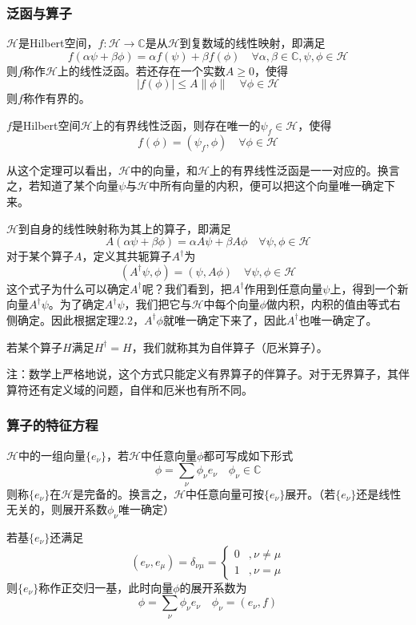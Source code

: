 \subsubsection{泛函与算子}
$\mathcal{H}$是Hilbert空间，$f:\mathcal{H}\to \mathbb{C}$是从$\mathcal{H}$到复数域的线性映射，即满足
$$f(\alpha\psi+\beta\phi)=\alpha f(\psi)+\beta f(\phi)\quad\forall\alpha,\beta\in\mathbb{C},\psi,\phi\in\mathcal{H}$$
则$f$称作$\mathcal{H}$上的线性泛函。若还存在一个实数$A\geq 0$，使得
$$|f(\phi)|\leq A\|\phi\|\quad\forall\phi\in\mathcal{H}$$
则$f$称作有界的。

\begin{theorem}
    $f$是Hilbert空间$\mathcal{H}$上的有界线性泛函，则存在唯一的$\psi_f\in\mathcal{H}$，使得
    $$f(\phi)=(\psi_f,\phi)\quad\forall \phi\in\mathcal{H}$$
\end{theorem}
从这个定理可以看出，$\mathcal{H}$中的向量，和$\mathcal{H}$上的有界线性泛函是一一对应的。换言之，若知道了某个向量$\psi$与$\mathcal{H}$中所有向量的内积，便可以把这个向量唯一确定下来。

$\mathcal{H}$到自身的线性映射称为其上的算子，即满足
$$A(\alpha\psi+\beta\phi)=\alpha A\psi+\beta A\phi\quad \forall\psi,\phi\in \mathcal{H}$$
对于某个算子$A$，定义其共轭算子$A^\dagger$为
$$(A^\dagger\psi,\phi)=(\psi,A\phi)\quad \forall\psi,\phi\in\mathcal{H}$$
这个式子为什么可以确定$A^\dagger$呢？我们看到，把$A^\dagger$作用到任意向量$\psi$上，得到一个新向量$A^\dagger\psi$。为了确定$A^\dagger\psi$，我们把它与$\mathcal{H}$中每个向量$\phi$做内积，内积的值由等式右侧确定。因此根据定理2.2，$A^\dagger\phi$就唯一确定下来了，因此$A^\dagger$也唯一确定了。

若某个算子$H$满足$H^\dagger=H$，我们就称其为自伴算子（厄米算子）。

注：数学上严格地说，这个方式只能定义有界算子的伴算子。对于无界算子，其伴算符还有定义域的问题，自伴和厄米也有所不同。
\subsubsection{算子的特征方程}
$\mathcal{H}$中的一组向量$\{e_\nu\}$，若$\mathcal{H}$中任意向量$\phi$都可写成如下形式
$$\phi=\sum_\nu \phi_\nu e_\nu\quad \phi_\nu\in\mathbb{C}$$
则称$\{e_\nu\}$在$\mathcal{H}$是完备的。换言之，$\mathcal{H}$中任意向量可按$\{e_\nu\}$展开。（若$\{e_\nu\}$还是线性无关的，则展开系数$\phi_\nu$唯一确定）

若基$\{e_\nu\}$还满足
$$(e_\nu,e_\mu)=\delta_{\nu\mu}=\left\{\begin{array}{ll}
    0&,\nu\neq\mu\\
    1&,\nu=\mu
\end{array}\right.$$
则$\{e_\nu\}$称作正交归一基，此时向量$\phi$的展开系数为
$$\phi=\sum_\nu\phi_\nu e_\nu\quad \phi_\nu=(e_\nu, f)$$

